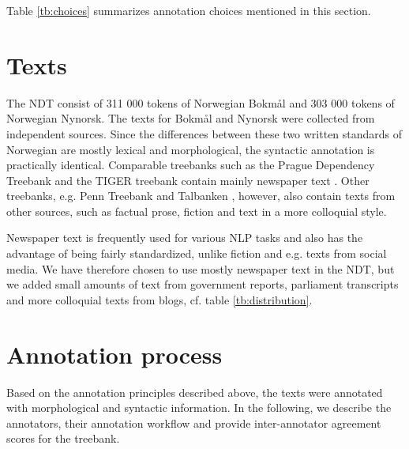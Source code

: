 \documentclass[10pt,a4paper]{article}
\begin{document}
Table \ref{tb:choices} summarizes annotation choices mentioned in this section.


\section{Texts}
The NDT consist of 311 000 tokens of Norwegian Bokmål and 303 000 tokens of Norwegian Nynorsk. The texts for Bokmål and Nynorsk were collected from independent sources. Since the differences between these two written standards of Norwegian are mostly lexical and morphological, the syntactic annotation is practically identical. Comparable treebanks such as the Prague Dependency Treebank and the TIGER treebank contain mainly newspaper text \cite{Boh:Haj:Hla:2003,Bra:2004}. Other treebanks, e.g. Penn Treebank and Talbanken \cite{Mar:San:Mar:93,Niv:Nil:Hal:2006}, however, also contain texts from other sources, such as factual prose, fiction and text in a more colloquial style.

Newspaper text is frequently used for various NLP tasks and also has the advantage of being fairly standardized, unlike fiction and e.g. texts from social media. We have therefore chosen to use mostly newspaper text in the NDT, but we added small amounts of text from government reports, parliament transcripts and more colloquial texts from blogs, cf. table \ref{tb:distribution}.



\section{Annotation process}
Based on the annotation principles described above, the texts were
annotated with morphological and syntactic information. In the
following, we describe the annotators, their annotation workflow and
provide inter-annotator agreement scores for the treebank.
\end{document}
